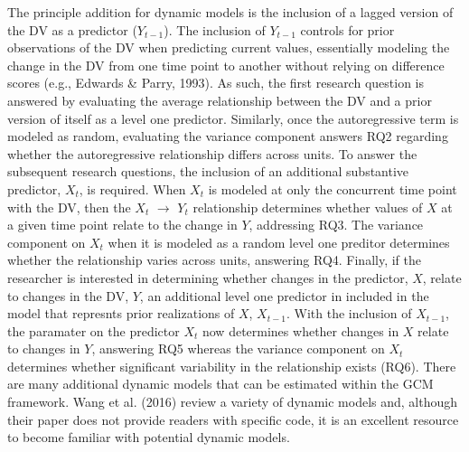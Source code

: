 \documentclass[english,,man]{apa6}
\begin{document}
The principle addition for dynamic models is the inclusion of a lagged version of the DV as a predictor (\(Y_{t-1}\)). The inclusion of \(Y_{t-1}\) controls for prior observations of the DV when predicting current values, essentially modeling the change in the DV from one time point to another without relying on difference scores (e.g., Edwards \& Parry, 1993). As such, the first research question is answered by evaluating the average relationship between the DV and a prior version of itself as a level one predictor. Similarly, once the autoregressive term is modeled as random, evaluating the variance component answers RQ2 regarding whether the autoregressive relationship differs across units. To answer the subsequent research questions, the inclusion of an additional substantive predictor, \(X_t\), is required. When \(X_t\) is modeled at only the concurrent time point with the DV, then the \(X_t\) \(\rightarrow\) \(Y_t\) relationship determines whether values of \(X\) at a given time point relate to the change in \(Y\), addressing RQ3. The variance component on \(X_t\) when it is modeled as a random level one preditor determines whether the relationship varies across units, answering RQ4. Finally, if the researcher is interested in determining whether changes in the predictor, \(X\), relate to changes in the DV, \(Y\), an additional level one predictor in included in the model that represnts prior realizations of \(X\), \(X_{t-1}\). With the inclusion of \(X_{t-1}\), the paramater on the predictor \(X_t\) now determines whether changes in \(X\) relate to changes in \(Y\), answering RQ5 whereas the variance component on \(X_t\) determines whether significant variability in the relationship exists (RQ6). There are many additional dynamic models that can be estimated within the GCM framework. Wang et al. (2016) review a variety of dynamic models and, although their paper does not provide readers with specific code, it is an excellent resource to become familiar with potential dynamic models.
\end{document}
